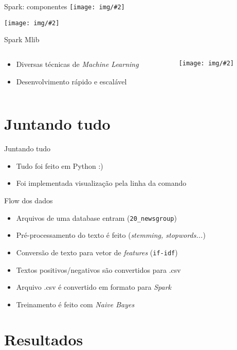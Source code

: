 \documentclass[11pt]{beamer}
\newcommand{\img}[2][width=1.0\textwidth]
	{\centering \texttt{[image: img/\#2]}}
\newcommand{\tit}[1]{\textit{#1}}
\newcommand{\ttt}[1]{\texttt{#1}}
\begin{document}
\begin{frame}{Spark: componentes}
	\img[width=0.5\linewidth]{spark_stack.png}

	\img[width=0.5\linewidth]{hadoop_logo.png}
\end{frame}

\begin{frame}{Spark Mlib}
	\begin{columns}
		\begin{column}{0.5\textwidth}
			\begin{itemize}
				\item Diversas técnicas de \tit{Machine Learning}
				\item Desenvolvimento rápido e escalável
			\end{itemize}
		\end{column}
		\begin{column}{0.5\textwidth}
			\img[width=0.7\linewidth]{spark_mlib.png}
		\end{column}
	\end{columns}
\end{frame}

\section{Juntando tudo}

\begin{frame}{Juntando tudo}
	\begin{itemize}
		\item Tudo foi feito em Python :)
		\item Foi implementada visualização pela linha da comando
	\end{itemize}
\end{frame}

\begin{frame}{Flow dos dados}
	\begin{itemize}
		\item Arquivos de uma database entram (\ttt{20\_newsgroup})
		\item Pré-processamento do texto é feito (\tit{stemming, stopwords...})
		\item Conversão de texto para vetor de \tit{features} (\ttt{if-idf})
		\item Textos positivos/negativos são convertidos para .csv
		\item Arquivo .csv é convertido em formato para \tit{Spark}
		\item Treinamento é feito com \tit{Naive Bayes}
	\end{itemize}
\end{frame}

\section{Resultados}
\end{document}
